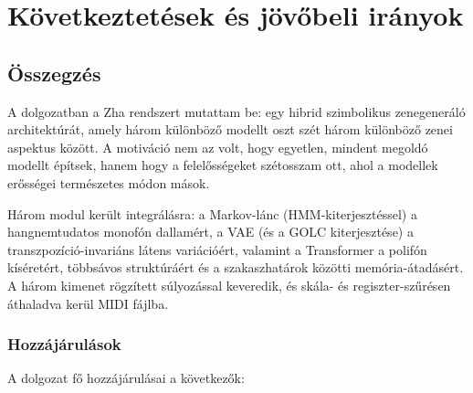 
\chapter{Következtetések és jövőbeli irányok}

\section{Összegzés}

A dolgozatban a Zha rendszert mutattam be: egy hibrid szimbolikus zenegeneráló architektúrát, amely három különböző modellt oszt szét három különböző zenei aspektus között. A motiváció nem az volt, hogy egyetlen, mindent megoldó modellt építsek, hanem hogy a felelősségeket szétosszam ott, ahol a modellek erősségei természetes módon mások.

Három modul került integrálásra: a Markov-lánc (HMM-kiterjesztéssel) a hangnemtudatos monofón dallamért, a VAE (és a GOLC kiterjesztése) a transzpozíció-invariáns látens variációért, valamint a Transformer a polifón kíséretért, többsávos struktúráért és a szakaszhatárok közötti memória-átadásért. A három kimenet rögzített súlyozással keveredik, és skála- és regiszter-szűrésen áthaladva kerül MIDI fájlba.

\subsection{Hozzájárulások}

A dolgozat fő hozzájárulásai a következők:


